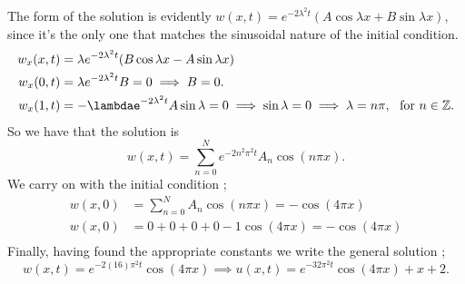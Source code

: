 \documentclass[
	12pt,
	]{article}
\theoremstyle{definition}
\theoremstyle{definition}
\theoremstyle{definition}
\theoremstyle{definition}
\theoremstyle{definition}
\theoremstyle{example}
\theoremstyle{note}
\theoremstyle{remark}
\theoremstyle{example}
\begin{document}
			 The form of the solution is evidently $w(x,t) = e^{-2 \lambda^{2} t} (A \cos \lambda x + B \sin \lambda x)$, since it's the only one that matches the sinusoidal nature of the initial condition. 
			\begin{align*}
				w_{x} (x,t) &= \lambda e^{-2 \lambda^{2} t} (B \cos \lambda x - A \sin \lambda x ) \\
				w_{x} (0,t) &= \lambda e^{-2 \lambda^{2 }t} B =0 \implies B = 0. \\
				w_{x} (1,t) &= -\lambdae^{-2 \lambda^{2 }t} A \sin \lambda = 0 \implies \sin \lambda =0 \implies \lambda = n\pi ,  \ \ \text{for } n \in \mathbb{Z}.
			\end{align*}
			So we have that the solution is 
			 $$ w(x,t) = \sum_{n=0}^{N} e^{-2 n^{2} \pi^{2 }t} A_{n} \cos(n \pi x).$$
			 We carry on with the initial condition ; 
			 \begin{align*}
			 	w(x,0) &= \sum_{n=0}^{N} A_{n} \cos(n \pi x) = -\cos(4 \pi x) \\
			 	w(x,0) &= 0 + 0 + 0 + 0 - 1 \cos (4 \pi x) = - \cos(4 \pi x) \\
 			 \end{align*}
 			 Finally, having found the appropriate constants we write the general solution ; 
 			 $$ w(x,t) = e^{-2 (16) \pi^{2} t} \cos(4 \pi x) \implies  u(x,t) = e^{-32\pi^{2} t} \cos(4 \pi x) + x + 2. $$
\end{document}

